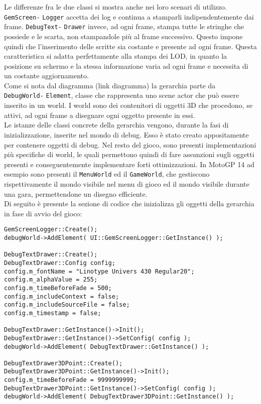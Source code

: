 Le differenze fra le due classi si mostra anche nei loro scenari di utilizzo. \texttt{GemScreen-} \texttt{Logger} accetta dei log e continua a stamparli indipendentemente dai frame. \texttt{DebugText-} \texttt{Drawer} invece, ad ogni frame, stampa tutte le stringhe che possiede e le scarta, non stampandole più al frame successivo. Questo impone quindi che l'inserimento delle scritte sia costante e presente ad ogni frame. Questa caratteristica si adatta perfettamente alla stampa dei LOD, in quanto la posizione su schermo e la stessa informazione varia ad ogni frame e necessita di un costante aggiornamento.\\ 

Come si nota dal diagramma (link diagramma) la gerarchia parte da \texttt{DebugWorld-} \texttt{Element}, classe che rappresenta uno scene actor che può essere inserito in un world. I world sono dei contenitori di oggetti 3D che procedono, se attivi, ad ogni frame a disegnare ogni oggetto presente in essi.\\

Le istanze delle classi concrete della gerarchia vengono, durante la fasi di inizializzazione, inserite nel mondo di debug. Esso è stato creato appositamente per contenere oggetti di debug. Nel resto del gioco, sono presenti implementazioni più specifiche di world, le quali permettono quindi di fare assunzioni sugli oggetti presenti e conseguentemente implementare forti ottimizzazioni. In MotoGP 14 ad esempio sono presenti il \texttt{MenuWorld} ed il \texttt{GameWorld}, che gestiscono rispettivamente il mondo visibile nel menu di gioco ed il mondo visibile durante una gara, permettendone un disegno efficiente.\\

Di seguito è presente la sezione di codice che inizializza gli oggetti della gerarchia in fase di avvio del gioco:

\begin{lstlisting}[style=maurizio-code, caption=Inizializzazione delle classi responsabili della stampa di testo, label={code:initTextClasses}]
GemScreenLogger::Create();
debugWorld->AddElement( UI::GemScreenLogger::GetInstance() );

DebugTextDrawer::Create();
DebugTextDrawer::Config config;
config.m_fontName = "Linotype Univers 430 Regular20";
config.m_alphaValue = 255;
config.m_timeBeforeFade = 500;
config.m_includeContext = false;
config.m_includeSourceFile = false;
config.m_timestamp = false;

DebugTextDrawer::GetInstance()->Init();
DebugTextDrawer::GetInstance()->SetConfig( config );
debugWorld->AddElement( DebugTextDrawer::GetInstance() );

DebugTextDrawer3DPoint::Create();
DebugTextDrawer3DPoint::GetInstance()->Init();
config.m_timeBeforeFade = 9999999999;
DebugTextDrawer3DPoint::GetInstance()->SetConfig( config );
debugWorld->AddElement( DebugTextDrawer3DPoint::GetInstance() );
\end{lstlisting}

